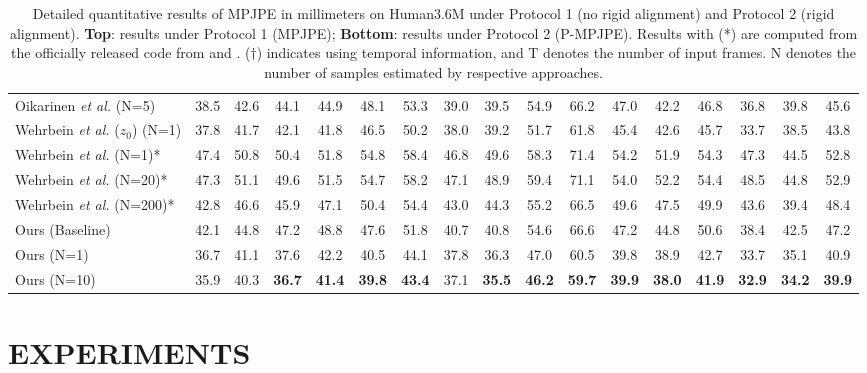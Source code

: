 \documentclass[letterpaper, 10 pt, conference]{ieeeconf}
\begin{document}
\begin{table*}[t]
{\begin{tabular}{l|ccccccccccccccc|c}
        Oikarinen \textit{et al.} \cite{oikarinen2021graphmdn} (N=5)  & 38.5 & 42.6 & 44.1 & 44.9 & 48.1 & 53.3 & 39.0 & 39.5 & 54.9 & 66.2 & 47.0 & 42.2 & 46.8 & 36.8 & 39.8 & 45.6 \\
        Wehrbein \textit{et al.} \cite{wehrbein2021probabilistic} ($z_{0}$) (N=1)  & 37.8& 41.7& 42.1& 41.8& 46.5& 50.2& 38.0& 39.2& 51.7& 61.8& 45.4& 42.6& 45.7& 33.7& 38.5& 43.8 \\
        Wehrbein \textit{et al.} \cite{wehrbein2021probabilistic} (N=1)* & 47.4 & 50.8 & 50.4 & 51.8 & 54.8 & 58.4 & 46.8 & 49.6 & 58.3 & 71.4 & 54.2 & 51.9 & 54.3 & 47.3 & 44.5 & 52.8 \\
        Wehrbein \textit{et al.} \cite{wehrbein2021probabilistic} (N=20)* & 47.3 & 51.1 & 49.6 & 51.5 & 54.7 & 58.2 & 47.1 & 48.9 & 59.4 & 71.1 & 54.0 &52.2& 54.4 & 48.5 & 44.8 & 52.9 \\
        Wehrbein \textit{et al.} \cite{wehrbein2021probabilistic} (N=200)* & 42.8 & 46.6 & 45.9 & 47.1 & 50.4 & 54.4 & 43.0 & 44.3 & 55.2 & 66.5 & 49.6 & 47.5 & 49.9 & 43.6 & 39.4 & 48.4 \\
        \hline
        Ours (Baseline) & 42.1 & 44.8 & 47.2 & 48.8 & 47.6 & 51.8 & 40.7 & 40.8 & 54.6 & 66.6 & 47.2 & 44.8 & 50.6 & 38.4 & 42.5 & 47.2\\
        Ours (N=1) & 36.7 & 41.1 & 37.6 & 42.2 & 40.5 & 44.1 & 37.8 & 36.3 & 47.0 & 60.5 & 39.8 & 38.9 & 42.7 & 33.7 & 35.1 & 40.9\\
        Ours (N=10) & 35.9 & 40.3 & \textbf{36.7}&\textbf{41.4} & \textbf{39.8} & \textbf{43.4} & 37.1 & \textbf{35.5} & \textbf{46.2} & \textbf{59.7} & \textbf{39.9} & \textbf{38.0}& \textbf{41.9} & \textbf{32.9}  & \textbf{34.2}& \textbf{39.9} \\
        \bottomrule
    \end{tabular}
    }
    \caption{Detailed quantitative results of MPJPE in millimeters on Human3.6M under Protocol 1 (no rigid alignment) and Protocol 2 (rigid alignment). \textbf{Top}: results under Protocol 1 (MPJPE); \textbf{Bottom}: results under Protocol 2 (P-MPJPE). Results with (*) are computed from the officially released code from \cite{sharma2019monocular} and \cite{wehrbein2021probabilistic}. ($\dagger$) indicates using temporal information, and T denotes the number of input frames. N denotes the number of samples estimated by respective approaches.}
    \label{tab:table1}
    \vspace{-10pt}
\end{table*}  \section{EXPERIMENTS}
\end{document}
